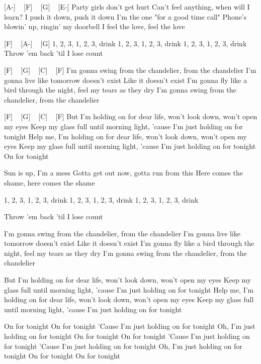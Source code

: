 [A-] ~ [F] ~ [G] ~ [E-]
Party girls don't get hurt
Can't feel anything, when will I learn?
I push it down, push it down
I'm the one "for a good time call"
Phone's blowin' up, ringin' my doorbell
I feel the love, feel the love

[F] ~ [A-] ~ [G]
1, 2, 3, 1, 2, 3, drink
1, 2, 3, 1, 2, 3, drink
1, 2, 3, 1, 2, 3, drink
Throw 'em back 'til I lose count

[F] ~ [G] ~ [C] ~ [F] 
I'm gonna swing from the chandelier, from the chandelier
I'm gonna live like tomorrow doesn't exist
Like it doesn't exist
I'm gonna fly like a bird through the night, feel my tears as they dry
I'm gonna swing from the chandelier, from the chandelier

[F] ~ [G] ~ [C] ~ [F]
But I'm holding on for dear life, won't look down, won't open my eyes
Keep my glass full until morning light, 'cause I'm just holding on for tonight
Help me, I'm holding on for dear life, won't look down, won't open my eyes
Keep my glass full until morning light, 'cause I'm just holding on for tonight
On for tonight

Sun is up, I'm a mess
Gotta get out now, gotta run from this
Here comes the shame, here comes the shame

1, 2, 3, 1, 2, 3, drink
1, 2, 3, 1, 2, 3, drink
1, 2, 3, 1, 2, 3, drink


Throw 'em back 'til I lose count

I'm gonna swing from the chandelier, from the chandelier
I'm gonna live like tomorrow doesn't exist
Like it doesn't exist
I'm gonna fly like a bird through the night, feel my tears as they dry
I'm gonna swing from the chandelier, from the chandelier

But I'm holding on for dear life, won't look down, won't open my eyes
Keep my glass full until morning light, 'cause I'm just holding on for tonight
Help me, I'm holding on for dear life, won't look down, won't open my eyes
Keep my glass full until morning light, 'cause I'm just holding on for tonight

On for tonight
On for tonight
'Cause I'm just holding on for tonight
Oh, I'm just holding on for tonight
On for tonight
On for tonight
'Cause I'm just holding on for tonight
'Cause I'm just holding on for tonight
Oh, I'm just holding on for tonight
On for tonight
On for tonight 